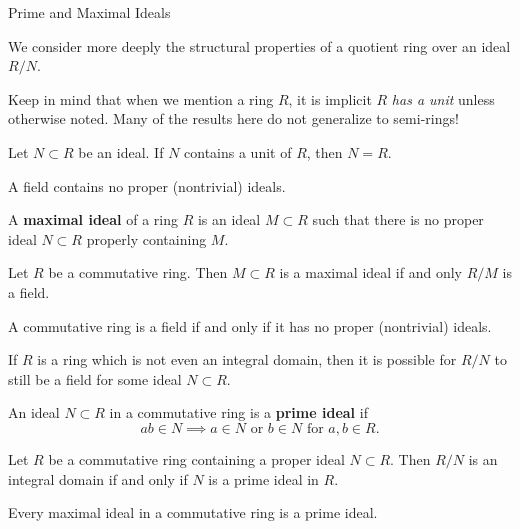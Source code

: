 \begin{section}{Prime and Maximal Ideals}

We consider more deeply the structural properties of a quotient ring over an ideal $R/N$.

\begin{danger}
Keep in mind that when we mention a ring $R$, it is implicit $R$ {\em has a unit} unless otherwise noted. Many of the results here do not generalize to semi-rings!
\end{danger}

\begin{prop}
Let $N \subset R$ be an ideal. If $N$ contains a unit of $R$, then $N = R$.
\end{prop}

\begin{prop}
A field contains no proper (nontrivial) ideals.
\end{prop}

\begin{defn}
A {\bf maximal ideal} of a ring $R$ is an ideal $M \subset R$ such that there is no proper ideal $N \subset R$ properly containing $M$.
\end{defn}

\begin{thm}
Let $R$ be a commutative ring. Then $M \subset R$ is a maximal ideal if and only $R/M$ is a field.
\end{thm}

\begin{cor}
A commutative ring is a field if and only if it has no proper (nontrivial) ideals.
\end{cor}

\begin{prop}
If $R$ is a ring which is not even an integral domain, then it is possible for $R/N$ to still be a field for some ideal $N \subset R$.
\end{prop}

\begin{defn}
An ideal $N \subset R$ in a commutative ring is a {\bf prime ideal} if $$ab \in N \implies a \in N \textrm{ or } b \in N \textrm{ for } a,b \in R.$$
\end{defn}

\begin{thm}
Let $R$ be a commutative ring containing a proper ideal $N \subset R$. Then $R/N$ is an integral domain if and only if $N$ is a prime ideal in $R$.
\end{thm}

\begin{cor}
Every maximal ideal in a commutative ring is a prime ideal.
\end{cor}


\end{section}
